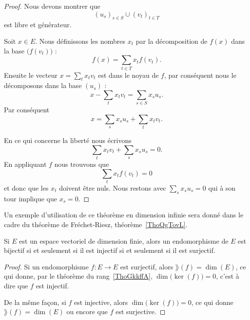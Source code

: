 \begin{proof}
    Nous devons montrer que
    \begin{equation}
          (u_s)_{s\in S}\cup (v_t)_{t\in T}
    \end{equation}
    est libre et générateur.

    Soit \( x\in E\). Nous définissons les nombres \( x_t\) par la décomposition de \( f(x)\) dans la base \( \big( f(v_t) \big)\) :
    \begin{equation}
        f(x)=\sum_{t\in T}x_tf(v_t).
    \end{equation}
    Ensuite le vecteur \( x=\sum_tx_tv_t\) est dans le noyau de \( f\), par conséquent nous le décomposons dans la base \( (u_s)\) :
    \begin{equation}
        x-\sum_tx_tv_t=\sum_{s\in S} x_su_s.
    \end{equation}
    Par conséquent
    \begin{equation}
        x=\sum_sx_su_s+\sum_tx_tv_t.
    \end{equation}

    En ce qui concerne la liberté nous écrivons
    \begin{equation}
        \sum_tx_tv_t+\sum_sx_su_s=0.
    \end{equation}
    En appliquant \( f\) nous trouvons que
    \begin{equation}
        \sum_tx_tf(v_t)=0
    \end{equation}
    et donc que les \( x_t\) doivent être nuls. Nous restons avec \( \sum_sx_su_s=0\) qui à son tour implique que \( x_s=0\).
\end{proof}
Un exemple d'utilisation de ce théorème en dimension infinie sera donné dans le cadre du théorème de Fréchet-Riesz, théorème~\ref{ThoQgTovL}.

\begin{corollary}       \label{CORooCCXHooALmxKk}
    Si \( E\) est un espace vectoriel de dimension finie, alors un endomorphisme de \( E\) est bijectif si et seulement si il est injectif si et seulement si il est surjectif.
\end{corollary}

\begin{proof}
    Si un endomorphisme \( f\colon E\to E\) est surjectif, alors \( \rang(f)=\dim(E)\), ce qui donne, par le théorème du rang~\ref{ThoGkkffA}, \( \dim\big( \ker(f) \big)=0\), c'est à dire que \( f\) est injectif.

    De la même façon, si \( f\) est injective, alors \( \dim\big( \ker(f) \big)=0\), ce qui donne \( \rang(f)=\dim(E)\) ou encore que \( f\) est surjective.
\end{proof}

